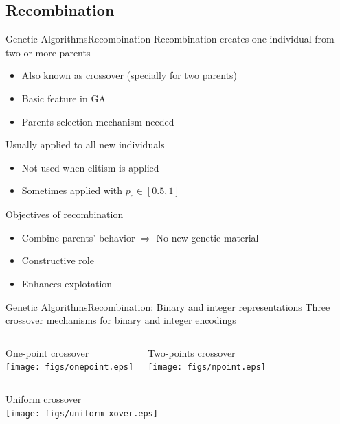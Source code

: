 \documentclass[10pt,compress]{beamer} %
\begin{document}
\subsection{Recombination}
\begin{frame}{Genetic Algorithms}{Recombination}
	Recombination creates one individual from two or more parents
	\begin{itemize}
		\item Also known as crossover (specially for two parents)
		\item Basic feature in GA
		\item Parents selection mechanism needed
	\end{itemize}
	Usually applied to all new individuals
	\begin{itemize}
		\item Not used when elitism is applied
		\item Sometimes applied with $p_c \in [0.5, 1]$ 
	\end{itemize}
	Objectives of recombination
	\begin{itemize}
		\item Combine parents' behavior $\Rightarrow$ No new genetic material
		\item Constructive role
		\item Enhances explotation
	\end{itemize}
\end{frame}

\begin{frame}{Genetic Algorithms}{Recombination: Binary and integer representations}
	Three crossover mechanisms for binary and integer encodings
    \begin{columns}
		\begin{center}
		One-point crossover\\
		\texttt{[image: figs/onepoint.eps]}\\
		\end{center}
		\begin{center}
		Two-points crossover\\
		\texttt{[image: figs/npoint.eps]}\\
		\end{center}
	   \end{columns}

	\begin{center}
		\centering Uniform crossover\\
		\texttt{[image: figs/uniform-xover.eps]}
	\end{center}

\end{frame}
\end{document}
